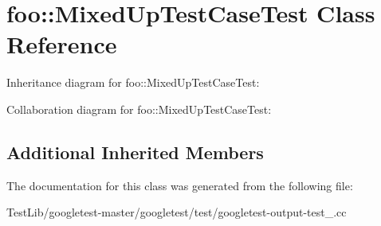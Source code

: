 \hypertarget{classfoo_1_1MixedUpTestCaseTest}{}\section{foo\+:\+:Mixed\+Up\+Test\+Case\+Test Class Reference}
\label{classfoo_1_1MixedUpTestCaseTest}


Inheritance diagram for foo\+:\+:Mixed\+Up\+Test\+Case\+Test\+:


Collaboration diagram for foo\+:\+:Mixed\+Up\+Test\+Case\+Test\+:
\subsection*{Additional Inherited Members}


The documentation for this class was generated from the following file\+:\begin{DoxyCompactItemize}
\item 
Test\+Lib/googletest-\/master/googletest/test/googletest-\/output-\/test\+\_\+.\+cc\end{DoxyCompactItemize}
